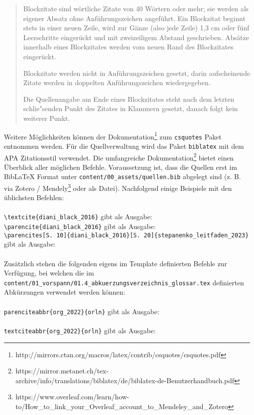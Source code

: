 \blockquote{Blockzitate sind wörtliche Zitate von 40 Wörtern oder mehr; sie werden als eigener Absatz ohne Anführungszeichen angeführt. Ein Blockzitat beginnt stets in einer neuen Zeile, wird zur Gänze (also jede Zeile) 1,3 cm oder fünf Leerschritte eingerückt und mit zweizeiligem Abstand geschrieben. Absätze innerhalb eines Blockzitates werden vom neuen Rand des Blockzitates eingerückt. \par Blockzitate werden nicht in Anführungszeichen gesetzt, darin aufscheinende Zitate werden in doppelten Anführungszeichen wiedergegeben. \par Die Quellenangabe am Ende eines Blockzitates steht nach dem letzten schlie"senden Punkt des Zitates in Klammern gesetzt, danach folgt kein weiterer Punkt.\\
\parencite[S. 111]{psychologie_richtlinien_2016}}
\noindent
Weitere Möglichkeiten können der Dokumentation\footnote{http://mirrors.ctan.org/macros/latex/contrib/csquotes/csquotes.pdf} zum \texttt{csquotes} Paket entnommen werden.
\newpage
Für die Quellverwaltung wird das Paket \texttt{biblatex} mit dem APA Zitationsstil verwendet. Die umfangreiche Dokumentation\footnote{https://mirror.metanet.ch/tex-archive/info/translations/biblatex/de/biblatex-de-Benutzerhandbuch.pdf} bietet einen Überblick aller möglichen Befehle. Voraussetzung ist, dass die Quellen erst im BibLaTeX Format unter \lstinline{content/00_assets/quellen.bib} abgelegt sind (z. B. via Zotero / Mendely\footnote{https://www.overleaf.com/learn/how-to/How\_to\_link\_your\_Overleaf\_account\_to\_Mendeley\_and\_Zotero} oder als Datei). Nachfolgend einige Beispiele mit den üblichsten Befehlen:\\
\\
\lstinline|\textcite{diani_black_2016}| gibt als Ausgabe:
\textcite{diani_black_2016}\\
\lstinline|\parencite{diani_black_2016}| gibt als Ausgabe:
\parencite{diani_black_2016}\\
\lstinline|\parencites[S. 10]{diani_black_2016}[S. 20]{stepanenko_leitfaden_2023}| gibt als Ausgabe:
\parencites[S. 10]{diani_black_2016}[S. 20]{stepanenko_leitfaden_2023}\\
\\
Zusätzlich stehen die folgenden eigens im Template definierten Befehle zur Verfügung, bei welchen die im \lstinline{content/01_vorspann/01.4_abkuerzungsverzeichnis_glossar.tex} definierten Abkürzungen verwendet werden können:\\
\\
\lstinline|parenciteabbr{org_2022}{orln}| gibt als Ausgabe: \\
\\
\lstinline|textciteabbr{org_2022}{orln}| gibt als Ausgabe: 
\\

